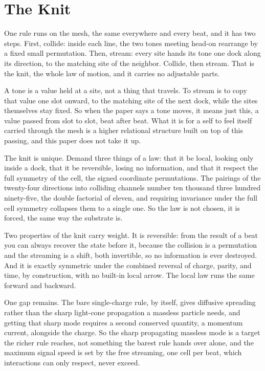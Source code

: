 \section{The Knit}

One rule runs on the mesh, the same everywhere and every beat, and it has two steps. First, collide: inside each
line, the two tones meeting head-on rearrange by a fixed small permutation. Then, stream: every site hands its tone one
dock along its direction, to the matching site of the neighbor. Collide, then stream. That is the knit, the whole law of
motion, and it carries no adjustable parts.

A tone is a value held at a site, not a thing that travels. To stream is to copy that value one slot onward, to the
matching site of the next dock, while the sites themselves stay fixed. So when the paper says a tone moves, it means
just this, a value passed from slot to slot, beat after beat. What it is for a self to feel itself carried through the
mesh is a higher relational structure built on top of this passing, and this paper does not take it up.

The knit is unique. Demand three things of a law: that it be local, looking only inside a dock, that it be reversible,
losing no information, and that it respect the full symmetry of the cell, the signed coordinate permutations. The
pairings of the twenty-four directions into colliding channels number ten thousand three hundred ninety-five, the double
factorial of eleven, and requiring invariance under the full cell symmetry collapses them to a single one. So the law is
not chosen, it is forced, the same way the substrate is.

Two properties of the knit carry weight. It is reversible: from the result of a beat you can always recover the state
before it, because the collision is a permutation and the streaming is a shift, both invertible, so no information is
ever destroyed. And it is exactly symmetric under the combined reversal of charge, parity, and time, by construction,
with no built-in local arrow. The local law runs the same forward and backward.

One gap remains. The bare single-charge rule, by itself, gives diffusive spreading rather than the
sharp light-cone propagation a massless particle needs, and getting that sharp mode requires a second conserved
quantity, a momentum current, alongside the charge. So the sharp propagating massless mode is a target the richer rule
reaches, not something the barest rule hands over alone, and the maximum signal speed is set by the free streaming, one
cell per beat, which interactions can only respect, never exceed.
